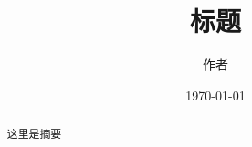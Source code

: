 \documentclass[UTF8]{ctexart}
\begin{document}
\title{标题}
\author{作者}
\date{\today}
\maketitle

\begin{abstract}
这里是摘要
\end{abstract}

\tableofcontents

\end{document}
